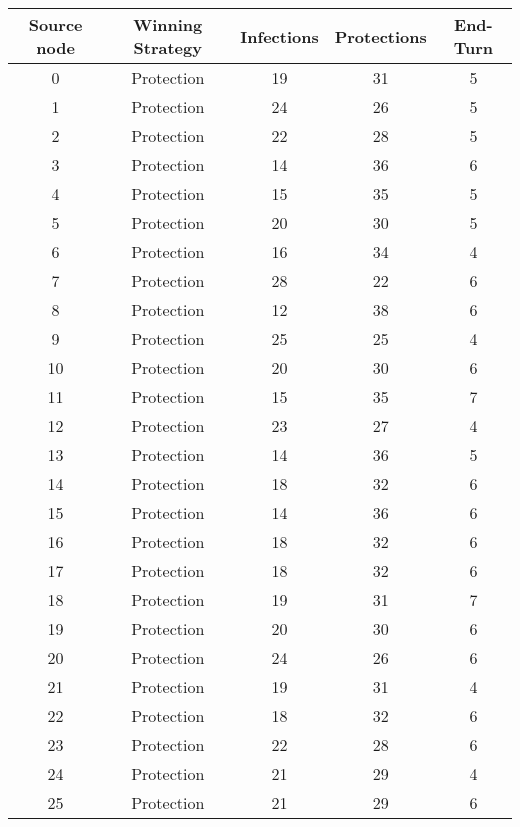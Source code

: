 \documentclass[results.tex]{subfiles}
\begin{document}
\begin{center}
  \begin{tabular}{| c || c | c | c | c |}
    \hline
    {\bfseries Source node} & {\bfseries Winning Strategy} & {\bfseries Infections} & {\bfseries Protections} & {\bfseries End-Turn} \\  %
    \hline\hline
    0 & Protection & 19 & 31 & 5 \\ 
    \hline
    1 & Protection & 24 & 26 & 5 \\ 
    \hline
    2 & Protection & 22 & 28 & 5 \\ 
    \hline
    3 & Protection & 14 & 36 & 6 \\ 
    \hline
    4 & Protection & 15 & 35 & 5 \\ 
    \hline
    5 & Protection & 20 & 30 & 5 \\ 
    \hline
    6 & Protection & 16 & 34 & 4 \\ 
    \hline
    7 & Protection & 28 & 22 & 6 \\ 
    \hline
    8 & Protection & 12 & 38 & 6 \\ 
    \hline
    9 & Protection & 25 & 25 & 4 \\ 
    \hline
    10 & Protection & 20 & 30 & 6 \\ 
    \hline
    11 & Protection & 15 & 35 & 7 \\ 
    \hline
    12 & Protection & 23 & 27 & 4 \\ 
    \hline
    13 & Protection & 14 & 36 & 5 \\ 
    \hline
    14 & Protection & 18 & 32 & 6 \\ 
    \hline
    15 & Protection & 14 & 36 & 6 \\ 
    \hline
    16 & Protection & 18 & 32 & 6 \\ 
    \hline
    17 & Protection & 18 & 32 & 6 \\ 
    \hline
    18 & Protection & 19 & 31 & 7 \\ 
    \hline
    19 & Protection & 20 & 30 & 6 \\ 
    \hline
    20 & Protection & 24 & 26 & 6 \\ 
    \hline
    21 & Protection & 19 & 31 & 4 \\ 
    \hline
    22 & Protection & 18 & 32 & 6 \\ 
    \hline
    23 & Protection & 22 & 28 & 6 \\ 
    \hline
    24 & Protection & 21 & 29 & 4 \\ 
    \hline
    25 & Protection & 21 & 29 & 6 \\ 

\end{tabular}
\end{center}
\end{document}
